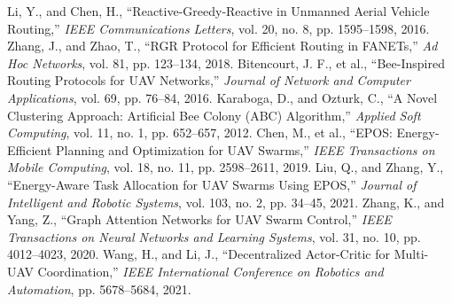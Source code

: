 \documentclass{article}
\begin{document}
\begin{thebibliography}{10}
 Li, Y., and Chen, H., ``Reactive-Greedy-Reactive in Unmanned Aerial Vehicle Routing,'' \textit{IEEE Communications Letters}, vol. 20, no. 8, pp. 1595--1598, 2016.
 Zhang, J., and Zhao, T., ``RGR Protocol for Efficient Routing in FANETs,'' \textit{Ad Hoc Networks}, vol. 81, pp. 123--134, 2018.
 Bitencourt, J. F., et al., ``Bee-Inspired Routing Protocols for UAV Networks,'' \textit{Journal of Network and Computer Applications}, vol. 69, pp. 76--84, 2016.
 Karaboga, D., and Ozturk, C., ``A Novel Clustering Approach: Artificial Bee Colony (ABC) Algorithm,'' \textit{Applied Soft Computing}, vol. 11, no. 1, pp. 652--657, 2012.
 Chen, M., et al., ``EPOS: Energy-Efficient Planning and Optimization for UAV Swarms,'' \textit{IEEE Transactions on Mobile Computing}, vol. 18, no. 11, pp. 2598--2611, 2019.
 Liu, Q., and Zhang, Y., ``Energy-Aware Task Allocation for UAV Swarms Using EPOS,'' \textit{Journal of Intelligent and Robotic Systems}, vol. 103, no. 2, pp. 34--45, 2021.
 Zhang, K., and Yang, Z., ``Graph Attention Networks for UAV Swarm Control,'' \textit{IEEE Transactions on Neural Networks and Learning Systems}, vol. 31, no. 10, pp. 4012--4023, 2020.
 Wang, H., and Li, J., ``Decentralized Actor-Critic for Multi-UAV Coordination,'' \textit{IEEE International Conference on Robotics and Automation}, pp. 5678--5684, 2021.



\end{thebibliography}
\end{document}
